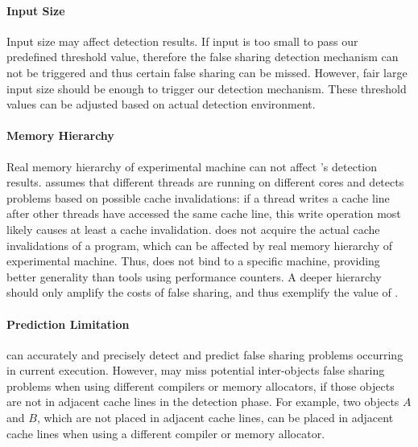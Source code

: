 \paragraph{Input Size} Input size may affect detection results. If input is too small to pass our predefined threshold value, therefore the false sharing detection mechanism can not be triggered and thus certain false sharing can be missed. However, fair large input size should be enough to trigger our detection mechanism. These threshold values can be adjusted based on actual detection environment.

\paragraph{Memory Hierarchy} Real memory hierarchy of experimental machine can not affect \Predator{}'s detection results. \Predator{} assumes that different threads are running on different cores and detects problems based on possible cache invalidations: if a thread writes a cache line after other threads have accessed the same cache line, this write operation most likely causes at least a cache invalidation. \Predator{} does not acquire the actual cache invalidations of a program, which can be affected by real memory hierarchy of experimental machine. Thus, \Predator{} does not bind to a specific machine, providing better generality than tools using performance counters. A deeper hierarchy should only amplify the costs of false sharing, and thus exemplify the value of \Predator{}.

\paragraph{Prediction Limitation} 
\Predator{} can accurately and precisely detect and predict false sharing problems occurring in current execution. However, \Predator{} may miss potential inter-objects false sharing problems when using different compilers or memory allocators, if those objects are not in adjacent cache lines in the detection phase. For example, two objects $A$ and $B$, which are not placed in adjacent cache lines, can be placed in adjacent cache lines when using a different compiler or memory allocator.